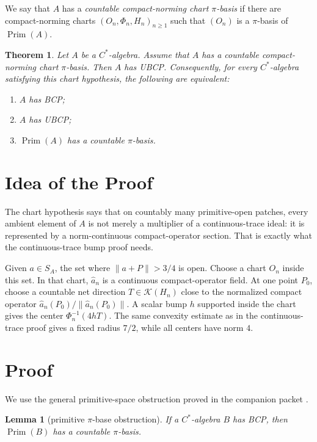 \documentclass[11pt]{article}
\newtheorem{theorem}{Theorem}
\newtheorem{lemma}{Lemma}
\newcommand{\Kcal}{\mathcal K}
\newcommand{\Prim}{\operatorname{Prim}}
\begin{document}
We say that \(A\) has a \emph{countable compact-norming chart \(\pi\)-basis}
if there are compact-norming charts \((O_n,\Phi_n,H_n)_{n\ge1}\) such that
\((O_n)\) is a \(\pi\)-basis of \(\Prim(A)\).

\begin{theorem}
\label{thm:main}
Let \(A\) be a \(C^*\)-algebra.  Assume that \(A\) has a countable
compact-norming chart \(\pi\)-basis.  Then \(A\) has UBCP.  Consequently, for
every \(C^*\)-algebra satisfying this chart hypothesis, the following are
equivalent:
\begin{enumerate}
    \item \(A\) has BCP;
    \item \(A\) has UBCP;
    \item \(\Prim(A)\) has a countable \(\pi\)-basis.
\end{enumerate}
\end{theorem}

\section*{Idea of the Proof}

The chart hypothesis says that on countably many primitive-open patches, every
ambient element of \(A\) is not merely a multiplier of a continuous-trace
ideal: it is represented by a norm-continuous compact-operator section.  That
is exactly what the continuous-trace bump proof needs.

Given \(a\in S_A\), the set where \(\|a+P\|>3/4\) is open.  Choose a chart
\(O_n\) inside this set.  In that chart, \(\widehat a_n\) is a continuous
compact-operator field.  At one point \(P_0\), choose a countable net direction
\(T\in \Kcal(H_n)\) close to the normalized compact operator
\(\widehat a_n(P_0)/\|\widehat a_n(P_0)\|\).  A scalar bump \(h\) supported
inside the chart gives the center \(\Phi_n^{-1}(4hT)\).  The same convexity
estimate as in the continuous-trace proof gives a fixed radius \(7/2\), while
all centers have norm \(4\).

\section*{Proof}

We use the general primitive-space obstruction proved in the companion packet
\cite{lane19primitive}.

\begin{lemma}[primitive \(\pi\)-base obstruction]
\label{lem:primitive}
If a \(C^*\)-algebra \(B\) has BCP, then \(\Prim(B)\) has a countable
\(\pi\)-basis.
\end{lemma}
\end{document}
